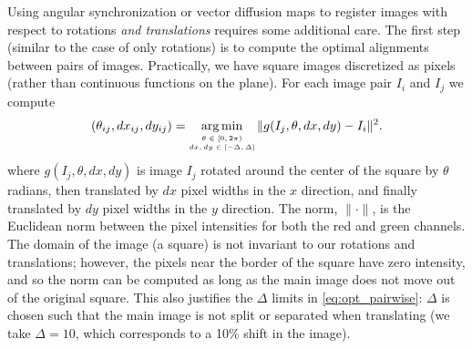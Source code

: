 \documentclass{pnastwo}
\DeclareMathOperator*{\argmin}{arg\,min}
\begin{document}
\begin{article}
\begin{materials}
Using angular synchronization or vector diffusion maps to register images with respect to rotations {\em and translations} requires some additional care.
%
%
%
The first step (similar to the case of only rotations) is to compute the optimal alignments between pairs of images.
%
Practically, we have square images discretized as pixels (rather than continuous functions on the plane).
%
For each image pair $I_i$ and $I_j$ we compute
\begin{equation}\label{eq:opt_pairwise}
(\theta_{ij}, dx_{ij}, dy_{ij}) = \argmin_{
\scriptsize \begin{matrix}
\theta \in [0, 2\pi) \\
dx, dy \in [-\Delta, \Delta]\\
\end{matrix}
} \|g(I_j, \theta, dx, dy) - I_i \|^2.
\end{equation}
where $g(I_j, \theta, dx, dy)$ is image $I_j$ rotated around the center of the square by $\theta$ radians, then translated by $dx$ pixel widths in the $x$ direction, and finally translated by $dy$ pixel widths in the $y$ direction.
%
The norm, $\| \cdot \|$, is the Euclidean norm between the pixel intensities for both the red and green channels.
%
The domain of the image (a square) is not invariant to our rotations and translations; however, the pixels near the border of the square have zero intensity, and so the norm can be computed as long as the main image does not move out of the original square.
%
%
This also justifies the $\Delta$ limits in \eqref{eq:opt_pairwise}: $\Delta$ is chosen such that the main image is not split or separated when translating (we take $\Delta=10$, which corresponds to a 10\% shift in the image). 

\end{materials}
\end{article}
\end{document}
